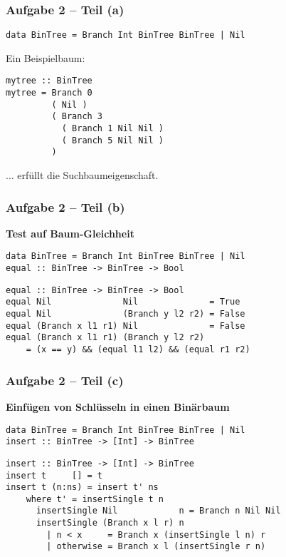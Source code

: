 \documentclass{beamer}
\begin{document}
\begin{frame}[t, fragile] \frametitle{Aufgabe 2 -- Teil (a)}
	\begin{lstlisting}[style=bg]
data BinTree = Branch Int BinTree BinTree | Nil
	\end{lstlisting}
	\pause
	
	Ein Beispielbaum: \\[6pt]
	\begin{lstlisting}[style=bg]
mytree :: BinTree 
mytree = Branch 0 
         ( Nil )
         ( Branch 3 
           ( Branch 1 Nil Nil )
           ( Branch 5 Nil Nil )
         )
	\end{lstlisting}
	... erfüllt die Suchbaumeigenschaft.
\end{frame}

\begin{frame}[t, fragile] \frametitle{Aufgabe 2 -- Teil (b)}
	\textbf{Test auf Baum-Gleichheit}
	
	\pause
	
	\begin{lstlisting}[style=bg]
data BinTree = Branch Int BinTree BinTree | Nil
equal :: BinTree -> BinTree -> Bool
	\end{lstlisting}
	
	\bigskip \pause
	
	\begin{lstlisting}[style=bg]
equal :: BinTree -> BinTree -> Bool
equal Nil              Nil              = True
equal Nil              (Branch y l2 r2) = False
equal (Branch x l1 r1) Nil              = False
equal (Branch x l1 r1) (Branch y l2 r2)
	= (x == y) && (equal l1 l2) && (equal r1 r2)
	\end{lstlisting}
\end{frame}

\begin{frame}[t, fragile] \frametitle{Aufgabe 2 -- Teil (c)}
	\textbf{Einfügen von Schlüsseln in einen Binärbaum}
	
	\begin{lstlisting}[style=bg]
data BinTree = Branch Int BinTree BinTree | Nil 
insert :: BinTree -> [Int] -> BinTree
	\end{lstlisting}
	
	\bigskip \pause
	
	\begin{lstlisting}[style=bg]
insert :: BinTree -> [Int] -> BinTree
insert t     [] = t
insert t (n:ns) = insert t' ns
 	where t' = insertSingle t n
      insertSingle Nil            n = Branch n Nil Nil
      insertSingle (Branch x l r) n
        | n < x     = Branch x (insertSingle l n) r
        | otherwise = Branch x l (insertSingle r n)
	\end{lstlisting}
\end{frame}
\end{document}
